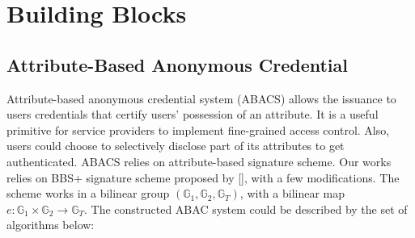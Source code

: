 \section{Building Blocks}
\subsection{Attribute-Based Anonymous Credential}
Attribute-based anonymous credential system (ABACS) allows the issuance to users credentials that certify users' possession of an attribute. It is a useful primitive for service providers to implement fine-grained access control. Also, users could choose to selectively disclose part of its attributes to get authenticated. ABACS relies on attribute-based signature scheme. Our works relies on BBS+ signature scheme proposed by [], with a few modifications. The scheme works in a bilinear group $(\mathbb{G}_{1}, \mathbb{G}_{2}, \mathbb{G}_{T})$, with a bilinear map $e: \mathbb{G}_{1} \times \mathbb{G}_{2} \longrightarrow \mathbb{G}_{T}$. 
The constructed ABAC system could be described by the set of algorithms below:\\

